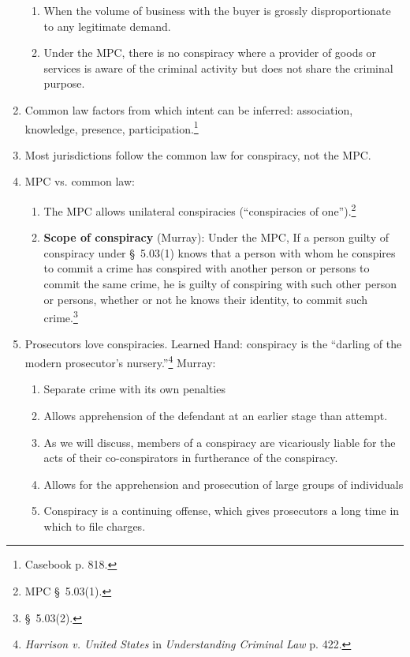 \begin{enumerate}
\begin{enumerate}
        \item When the volume of business with the buyer is grossly 
        disproportionate to any legitimate demand.
        \item Under the MPC, there is no conspiracy where a provider of goods 
        or services is aware of the criminal activity but does not share the 
        criminal purpose.
    \end{enumerate}
    \item Common law factors from which intent can be inferred: association, 
    knowledge, presence, participation.\footnote{Casebook p. 818.}
    \item Most jurisdictions follow the common law for conspiracy, not the 
    MPC.
    \item MPC vs. common law:
    \begin{enumerate}
        \item The MPC allows unilateral conspiracies (``conspiracies of 
        one'').\footnote{MPC \S\ 5.03(1).}
        \item \textbf{Scope of conspiracy} (Murray): Under the MPC, If a person guilty of 
        conspiracy under \S\ 5.03(1) knows that a person with whom he conspires to 
        commit a crime has conspired with another person or persons to commit the 
        same crime, he is guilty of conspiring with such other person or persons, 
        whether or not he knows their identity, to commit such 
        crime.\footnote{\S\ 5.03(2).}
    \end{enumerate}
    \item Prosecutors love conspiracies. Learned Hand: conspiracy is the 
    ``darling of the modern prosecutor's nursery.''\footnote{\emph{Harrison v. United 
    States} in \emph{Understanding Criminal Law} p. 422.} Murray:
    \begin{enumerate}
        \item Separate crime with its own penalties
        \item Allows apprehension of the defendant at an earlier stage than 
        attempt.
        \item As we will discuss, members of a conspiracy are vicariously 
        liable for the acts of their co-conspirators in furtherance of the 
        conspiracy.
        \item Allows for the apprehension and prosecution of large groups of 
        individuals \item Conspiracy is a continuing offense, which gives 
        prosecutors a long time in which to file charges.

\end{enumerate}
\end{enumerate}
